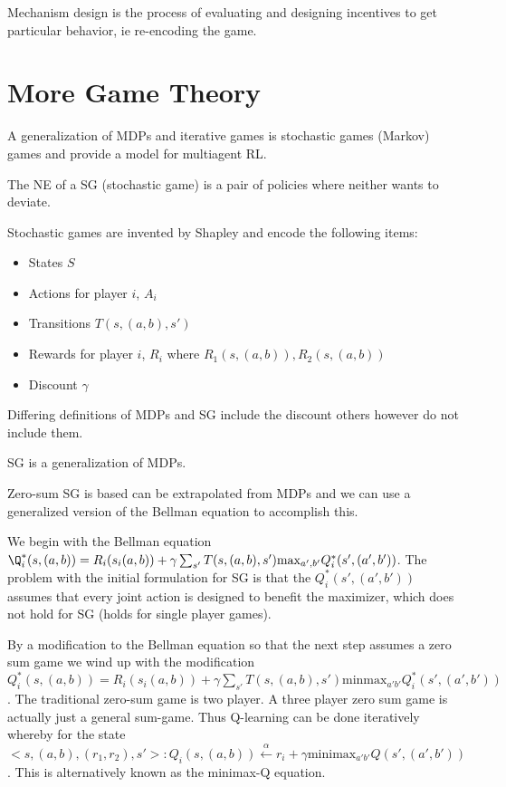 \documentclass{article}
\begin{document}
Mechanism design is the process of evaluating and designing incentives to
get particular behavior, ie re-encoding the game. 


\section{More Game Theory}

A generalization of MDPs and iterative games is stochastic games (Markov) 
games and provide a model for multiagent RL. 

The NE of a SG (stochastic game) is a pair of policies where neither wants to
deviate. 

Stochastic games are invented by Shapley and encode the following items:
\begin{itemize}
	\item States $S$
	\item Actions for player $i$, $A_i$
	\item Transitions $T(s, (a,b), s')$
	\item Rewards for player $i$, $R_i$ where $R_1(s,(a,b)), R_2(s,(a,b))$
	\item Discount $\gamma$
\end{itemize}

Differing definitions of MDPs and SG include the discount  others however do not
include them. 

SG is a generalization of MDPs. 

Zero-sum SG is based can be extrapolated from MDPs and we can use a generalized
version of the Bellman equation to accomplish this. 

We begin with the Bellman equation $\Q_i^*(s,(a,b)) = R_i(s_i(a,b)) + \gamma
\sum_{s'} T(s,(a,b),s')\text{max}_{a',b'}Q_i^*(s',(a',b'))$. The problem with
the initial formulation for SG is that the $Q^*_i(s',(a',b'))$  assumes that
every joint action is designed to benefit the maximizer, which does not hold for
SG (holds for single player games). 

By a modification to the Bellman equation so that the next step assumes a zero 
sum game we wind up with the modification $Q_i^*(s,(a,b)) = R_i(s_i(a,b)) + 
\gamma\sum_{s'}T(s, (a,b), s')\text{minmax}_{a'b'}Q_i^*(s',(a',b'))$. The
traditional zero-sum game is two player. A three player zero sum game is 
actually just a general sum-game. Thus Q-learning can be done iteratively 
whereby for the state $<s,(a,b),(r_1,r_2), s'>: Q_i(s,(a,b)) \xleftarrow{\alpha}
r_i + \gamma\text{minimax}_{a'b'}Q(s',(a',b'))$. This is alternatively known 
as the minimax-Q equation. 
\end{document}
